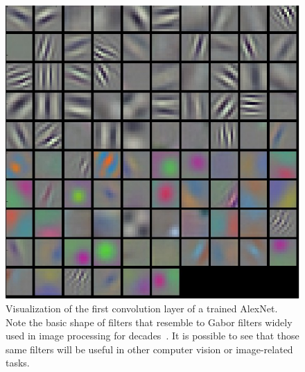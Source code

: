     \begin{figure}[!htbp]
      \centering
      \includegraphics[scale=0.4]{images/sota/filt1.jpeg}
      \caption[Convolution Neural Networks filters shape]{Visualization of the first convolution layer of a trained AlexNet. Note the basic shape of filters that resemble to Gabor filters widely used in image processing for decades~\citep{fogel1989gabor,jain1991unsupervised}. It is possible to see that those same filters will be useful in other computer vision or image-related tasks.}
      \label{fig:AlexNet_filters}
    \end{figure}

